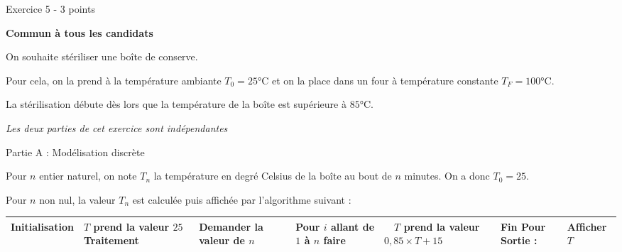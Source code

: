 
%
\begin{h2}Exercice 5 - 3 points\end{h2}
\textbf{Commun à tous les candidats}
\par
On souhaite stériliser une boîte de conserve.
\par
Pour cela, on la prend à la température ambiante $T_0 = 25$°C et on la place dans un four à température constante $T_F = 100$°C.
\par
La stérilisation débute dès lors que la température de la boîte est supérieure à $85$°C.
\par
\textit{Les deux parties de cet exercice sont indépendantes}
\begin{h3}Partie A : Modélisation discrète\end{h3}
Pour $n$ entier naturel, on note $T_n$ la température en degré Celsius de la boîte au bout de $n$ minutes. On a donc $T_0 = 25$.
\par
Pour $n$ non nul, la valeur $T_n$ est calculée puis affichée par l'algorithme suivant :
   \begin{tabularx}{0.8\linewidth}{|*{3}{>{\centering \arraybackslash }X|}}%
          \hline

          \textbf{Initialisation}  &  $T$ prend la valeur $25$
          \hline
               \textbf{Traitement	}  & Demander la valeur de $n$
          \hline
       &  Pour $i$ allant de $1$ à $n$ faire
          \hline
& $  \quad T$ prend la valeur $0,85 \times T + 15$
          \hline
& Fin Pour
\textbf{Sortie }: &Afﬁcher $T$
          \\ \hline
     \end{tabularx}

